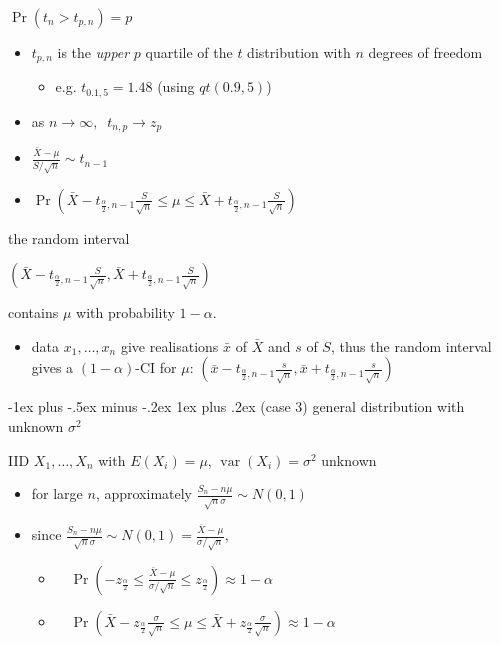 \documentclass[10pt, landscape]{article}
\makeatletter
\renewcommand{\subsubsection}{\@startsection{subsubsection}{3}{0mm}%
  {-1ex plus -.5ex minus -.2ex}%
  {1ex plus .2ex}%
{\normalfont\small\bfseries}}%
\newcommand{\var}{\mathop{\mathrm{var}}}
\newcommand{\xbar}{\bar{x}}
\newcommand{\Xbar}{\bar{X}}
\newcommand{\seq}[2][n]{#2_1, \dots, #2_{#1}}
\makeatother
\begin{document}
\begin{multicols*}{4}
\begin{tightcenter}
    $\Pr(t_n > t_{p,n}) = p$
  \end{tightcenter}

  \begin{itemize}
    \item $t_{p,n}$ is the \textit{upper} $p$ quartile of the $t$ distribution with $n$ degrees of freedom
      \begin{itemize}
        \item e.g. $t_{0.1,5} = 1.48$ (using $qt(0.9,5)$)
      \end{itemize}
    \item as $n \to \infty, \;\; t_{n,p} \to z_p$
    \item $\frac{\Xbar - \mu}{S/\sqrt n} \sim t_{n-1}$
    \item $\Pr( \Xbar - t_{\frac{\alpha}{2}, n-1} \frac{S}{\sqrt n} \leq \mu \leq \Xbar + t_{\frac{\alpha}{2}, n-1} \frac{S}{\sqrt n})$
  \end{itemize}

  \begin{tightcenter}
    the random interval

    $\left(\Xbar - t_{\frac{\alpha}{2}, n-1} \frac{S}{\sqrt n},  \Xbar + t_{\frac{\alpha}{2}, n-1} \frac{S}{\sqrt n}\right)$

    contains $\mu$ with probability $1-\alpha$.
  \end{tightcenter}

  \begin{itemize}
    \item data $\seq{x}$ give realisations $\xbar$ of $\Xbar$ and $s$ of $S$, thus the random interval gives a $(1-\alpha)$-CI for $\mu$: 
      $\left(\xbar - t_{\frac{\alpha}{2}, n-1} \frac{s}{\sqrt n},  \xbar + t_{\frac{\alpha}{2}, n-1} \frac{s}{\sqrt n}\right)$
  \end{itemize}

  \subsubsection{(case 3) general distribution with unknown $\sigma^2$}

  IID $\seq{X}$ with $E(X_i) =\mu$, $\var(X_i) = \sigma^2$ unknown

  \begin{itemize}
    \item for large $n$, approximately $\frac{S_n - n\mu}{\sqrt n \sigma} \sim N(0,1)$
    \item since $\frac{S_n - n\mu}{\sqrt n \sigma} \sim N(0,1) =  \frac{\Xbar - \mu}{\sigma / \sqrt n}$,
      \begin{itemize}
        \item $\quad \Pr(-z_{\frac{\alpha}{2}} \leq \frac{\Xbar - \mu}{\sigma / \sqrt n} \leq z_{\frac{\alpha}{2}}) \approx 1 - \alpha$
        \item $\quad \Pr(\Xbar-z_{\frac{\alpha}{2}}\frac{\sigma}{\sqrt n} \leq \mu \leq \Xbar + z_{\frac{\alpha}{2}}\frac{\sigma}{\sqrt n}) \approx 1 - \alpha$
      \end{itemize}
  \end{itemize}


\end{multicols*}
\end{document}
